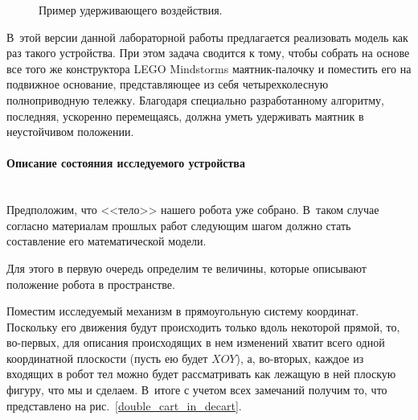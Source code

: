 \documentclass[12pt,a4paper,openany]{extarticle}
\begin{document}
\begin{figure}[h]
	\noindent{}
	\caption{Пример удерживающего воздействия.}
	\label{inverted_pendulum_with_force}
\end{figure}

В~этой версии данной лабораторной работы предлагается реализовать модель как раз такого устройства.
При этом задача сводится к тому, чтобы собрать на основе все того же конструктора LEGO Mindstorms маятник-палочку и поместить его на подвижное основание, представляющее из себя четырехколесную полноприводную тележку.
Благодаря специально разработанному алгоритму, последняя, ускоренно перемещаясь, должна уметь удерживать маятник в неустойчивом положении.

\paragraph*{Описание состояния исследуемого устройства}$\phantom{-}$\\
\hspace*{\parindent}Предположим, что <<тело>> нашего робота уже собрано.
В~таком случае согласно материалам прошлых работ следующим шагом должно стать составление его математической модели.

Для этого в первую очередь определим те величины, которые описывают положение робота в пространстве.

Поместим исследуемый механизм в прямоугольную систему координат.
Поскольку его движения будут происходить только вдоль некоторой прямой, то, во-первых, для описания происходящих в нем изменений хватит всего одной координатной плоскости (пусть ею будет $XOY$), а, во-вторых, каждое из входящих в робот тел можно будет рассматривать как лежащую в ней плоскую фигуру, что мы и сделаем. 
В~итоге с учетом всех замечаний получим то, что представлено на рис.~\ref{double_cart_in_decart}.
\end{document}
